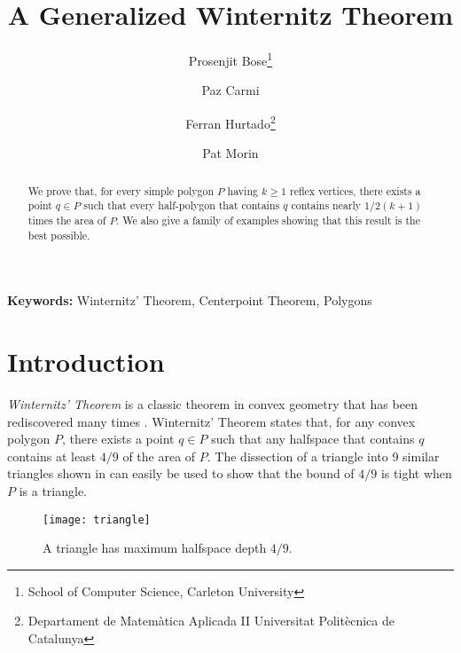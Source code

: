 \documentclass{article}
\title{A Generalized Winternitz Theorem}
\author{Prosenjit Bose\thanks{School of Computer Science, Carleton
University} \and
	Paz Carmi\footnotemark[1] \and
	Ferran Hurtado\thanks{Departament de Matem\`atica Aplicada II
	  Universitat Polit\`ecnica de Catalunya}  \and
	Pat Morin\footnotemark[1]}
\date{}
\begin{document}
\maketitle

\begin{abstract}
We prove that, for every simple polygon $P$ having $k\ge 1$ reflex
vertices, there exists a point $q\in P$ such that every half-polygon
that contains $q$ contains nearly $1/2(k+1)$ times the area of $P$.
We also give a family of examples showing that this result is the best
possible.
\end{abstract}

\noindent\textbf{Keywords:} Winternitz' Theorem, Centerpoint Theorem,
Polygons


\section{Introduction}

\emph{Winternitz' Theorem} \cite[pp.~54--55]{b23} is a classic theorem
in convex geometry that has been rediscovered many times
\cite{e55b,ll35,n45,n58,yb51}.  Winternitz' Theorem states that, for
any convex polygon $P$, there exists a point $q\in P$ such that any
halfspace that contains $q$ contains at least $4/9$ of the area of
$P$.  The dissection of a triangle into 9 similar triangles shown in
 can easily be used to show that the bound of $4/9$
is tight when $P$ is a triangle.

\begin{figure}[htbp]
  \begin{center}
    \texttt{[image: triangle]}
  \end{center}
  \caption{A triangle has maximum halfspace depth $4/9$.}
\end{figure}
\end{document}
